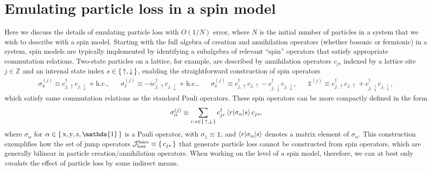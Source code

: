 \documentclass[aps,pra,twocolumn,longbibliography]{revtex4-2}
\renewcommand{\t}{\text} %
\newcommand{\bk}{\braket} %
\newcommand{\J}{\mathcal{J}}
\newcommand{\z}{\text{z}}
\newcommand{\x}{\text{x}}
\newcommand{\y}{\text{y}}
\newcommand{\1}{\mathds{1}}
\newcommand{\up}{\uparrow}
\newcommand{\dn}{\downarrow}
\begin{document}
\section{Emulating particle loss in a spin model}
\label{sec:particle_loss}

Here we discuss the details of emulating particle loss with $O(1/N)$
error, where $N$ is the initial number of particles in a system that
we wish to describe with a spin model.  Starting with the full algebra
of creation and annihilation operators (whether bosonic or fermionic)
in a system, spin models are typically implemented by identifying a
subalgebra of relevant ``spin'' operators that satisfy appropriate
commutation relations.  Two-state particles on a lattice, for example,
are described by annihilation operators $c_{js}$ indexed by a lattice
site $j\in\mathbb{Z}$ and an internal state index $s\in\set{\up,\dn}$,
enabling the straightforward construction of spin operators
\begin{align}
  \sigma_\x^{(j)} \equiv c_{j,\up}^\dag c_{j,\dn} + \t{h.c.},
  &&
  \sigma_\y^{(j)} \equiv - i c_{j,\up}^\dag c_{j,\dn} + \t{h.c.},
  &&
  \sigma_\z^{(j)}
  \equiv c_{j,\up}^\dag c_{j,\up} - c_{j,\dn}^\dag c_{j,\dn},
  &&
  \1^{(j)} \equiv c_{j,\up}^\dag c_{j,\up} + c_{j,\dn}^\dag c_{j,\dn},
\end{align}
which satisfy same commutation relations as the standard Pauli
operators.  These spin operators can be more compactly defined in the
form
\begin{align}
  \sigma_\alpha^{(j)} \equiv \sum_{r,s\in\set{\up,\dn}}
  c_{jr}^\dag \bk{r|\sigma_\alpha|s} c_{js},
\end{align}
where $\sigma_\alpha$ for $\alpha\in\set{\x,\y,\z,\1}$ is a Pauli
operator, with $\sigma_\1\equiv\1$; and $\bk{r|\sigma_\alpha|s}$
denotes a matrix element of $\sigma_\alpha$.  This construction
exemplifies how the set of jump operators
$\J_{\t{loss}}^{\t{bare}}\equiv\set{c_{js}}$ that generate particle
loss cannot be constructed from spin operators, which are generally
bilinear in particle creation/annihilation operators.  When working on
the level of a spin model, therefore, we can at best only {\it
  emulate} the effect of particle loss by some indirect means.
\end{document}
